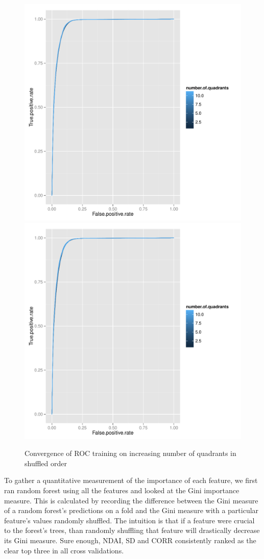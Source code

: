 \documentclass{article}\usepackage[]{graphicx}\usepackage[]{color}
\begin{document}
  \begin{figure}[H]
  \includegraphics[width=\linewidth, height = 170pts ]{ROC_converge_shuffle1.pdf}
\endminipage\hfill
{}
  \includegraphics[width=\linewidth, height = 170pts]{ROC_converge_shuffle2.pdf}
\endminipage\hfill
  \caption{Convergence of ROC training on increasing number of quadrants in shuffled order}\label{}
\end{figure}
  
To gather a quantitative measurement of the importance of each feature, we first ran random forest using all the features and looked at the Gini importance measure.  This is calculated by recording the difference between the Gini measure of a random forest's predictions on a fold and the Gini measure with a particular feature's values randomly shuffled.  The intuition is that if a feature were crucial to the forest's trees, than randomly shuffling that feature will drastically decrease its Gini measure.  Sure enough, NDAI, SD and CORR   consistently ranked as the clear top three in all cross validations. \\
\end{document}
